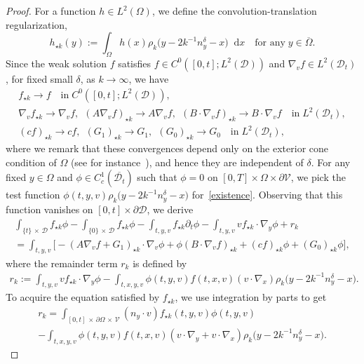 \documentclass[AHL,Unicode,longabstracts,published]{cedram}
\newcommand*{\dif}{\mathop{}\!\mathrm{d}}
\newcommand*\p{\partial}
\newcommand*\V {\mathcal{V}}
\newcommand*\D {\mathcal{D}}
\begin{document}
\begin{proof}
For a function $h\in L^2(\Omega)$, we define the convolution-translation regularization,
\begin{equation}\label{convolution}
h_{\star k}(y):=\int_{\Omega}h(x) \rho_k\big(y-2k^{-1} n_y^\delta-x\big)\dif x \quad\text{for any}\;y\in\overline{\Omega}.
\end{equation}
Since the weak solution $f$ satisfies $f\in C^0([0,t];L^2(\D))$ and $\nabla_vf\in L^2(\D_t)$, for fixed small $\delta$, as $k\rightarrow\infty$, we have
\begin{multline}\label{gtf}
f_{\star k}\rightarrow f \quad\text{in}\; C^0\left([0,t];L^2(\D)\right),
\\
\nabla_vf_{\star k}\rightarrow \nabla_vf,\ \ (A\nabla_vf)_{\star k}\rightarrow A\nabla_vf,\ \ (B\cdot\nabla_vf)_{\star k}\rightarrow B\cdot\nabla_vf \quad\text{in}\; L^2(\D_t),\\
(cf)_{\star k}\rightarrow cf,\ \ (G_1)_{\star k}\rightarrow G_1,\ \ (G_0)_{\star k}\rightarrow G_0 \quad\text{in}\;L^2(\D_t), 
\end{multline}
where we remark that these convergences depend only on the exterior cone condition of $\Omega$ (see for instance~\cite[Theorem~2.4]{BLD}), and hence they are independent of $\delta$. For any fixed $y\in\Omega$ and $\phi\in C_c^1(\overline{\D_t})$ such that $\phi=0$ on $[0,T]\times\Omega\times\p\V$, we pick the test function $\phi(t,y,v)\rho_k\big(y-2k^{-1} n_y^\delta-x\big)$ for~\eqref{existence}. Observing that this function vanishes on $[0,t]\times\p\D$, we derive
\begin{multline}\label{rk0}
\int_{\{t\}\,\times\,\D}f_{\star k}\phi-\int_{\{0\}\,\times\,\D}f_{\star k}\phi -\int_{t,y,v}f_{\star k}\p_t\phi -\int_{t,y,v}vf_{\star k}\cdot\nabla_y\phi + r_k \\
= \int_{t,y,v}\big[-(A\nabla_vf+G_1)_{\star k}\cdot\nabla_v\phi +\phi(B\cdot\nabla_vf)_{\star k} + (cf)_{\star k}\phi + (G_0)_{\star k}\phi\big],
\end{multline}
where the remainder term $r_k$ is defined by
\begin{align*}
r_k:= \int_{t,y,v}vf_{\star k}\cdot\nabla_y\phi -\int_{t,x,y,v} \phi(t,y,v) f(t,x,v)(v\cdot\nabla_x)\rho_k\big(y-2k^{-1}n_y^\delta-x\big).
\end{align*}
To acquire the equation satisfied by $f_{\star k}$, we use integration by parts to get
\begin{multline*}
r_k=\int_{[0,t]\,\times\,\p\Omega\,\times\,\V} (n_y\cdot v) f_{\star k}(t,y,v) \phi(t,y,v)\\
-\int_{t,x,y,v} \phi(t,y,v)f(t,x,v) (v\cdot\nabla_y+v\cdot\nabla_x) \rho_k\big(y-2k^{-1}n_y^\delta-x\big).

\end{multline*}
\end{proof}
\end{document}
